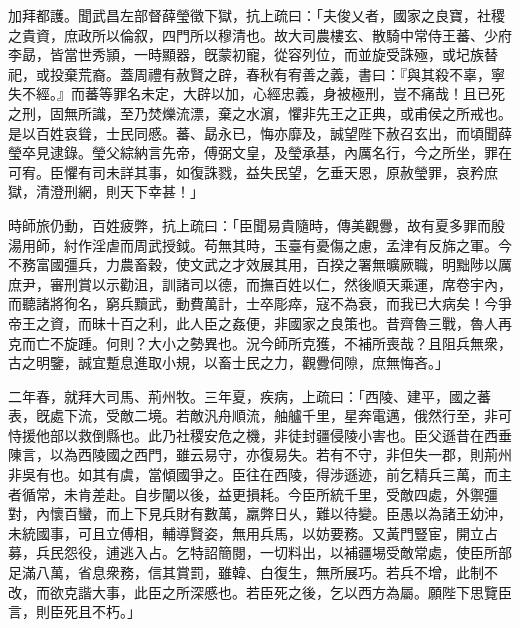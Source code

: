 \begin{pinyinscope}
 
 
 
 加拜都護。聞武昌左部督薛瑩徵下獄，抗上疏曰：「夫俊乂者，國家之良寶，社稷之貴資，庶政所以倫叙，四門所以穆清也。故大司農樓玄、散騎中常侍王蕃、少府李勗，皆當世秀頴，一時顯器，旣蒙初寵，從容列位，而並旋受誅殛，或圮族替祀，或投棄荒裔。蓋周禮有赦賢之辟，春秋有宥善之義，書曰：『與其殺不辜，寧失不經。』而蕃等罪名未定，大辟以加，心經忠義，身被極刑，豈不痛哉！且已死之刑，固無所識，至乃焚爍流漂，棄之水濵，懼非先王之正典，或甫侯之所戒也。是以百姓哀聳，士民同慼。蕃、勗永已，悔亦靡及，誠望陛下赦召玄出，而頃聞薛瑩卒見逮錄。瑩父綜納言先帝，傅弼文皇，及瑩承基，內厲名行，今之所坐，罪在可宥。臣懼有司未詳其事，如復誅戮，益失民望，乞垂天恩，原赦瑩罪，哀矜庶獄，清澄刑網，則天下幸甚！」
 
 
 
 
 時師旅仍動，百姓疲弊，抗上疏曰：「臣聞易貴隨時，傳美觀釁，故有夏多罪而殷湯用師，紂作淫虐而周武授鉞。苟無其時，玉臺有憂傷之慮，孟津有反旆之軍。今不務富國彊兵，力農畜穀，使文武之才效展其用，百揆之署無曠厥職，明黜陟以厲庶尹，審刑賞以示勸沮，訓諸司以德，而撫百姓以仁，然後順天乘運，席卷宇內，而聽諸將徇名，窮兵黷武，動費萬計，士卒彫瘁，寇不為衰，而我已大病矣！今爭帝王之資，而昧十百之利，此人臣之姦便，非國家之良策也。昔齊魯三戰，魯人再克而亡不旋踵。何則？大小之勢異也。況今師所克獲，不補所喪哉？且阻兵無衆，古之明鑒，誠宜蹔息進取小規，以畜士民之力，觀釁伺隙，庶無悔吝。」
 
 
 
 
 二年春，就拜大司馬、荊州牧。三年夏，疾病，上疏曰：「西陵、建平，國之蕃表，旣處下流，受敵二境。若敵汎舟順流，舳艫千里，星奔電邁，俄然行至，非可恃援他部以救倒縣也。此乃社稷安危之機，非徒封疆侵陵小害也。臣父遜昔在西垂陳言，以為西陵國之西門，雖云易守，亦復易失。若有不守，非但失一郡，則荊州非吳有也。如其有虞，當傾國爭之。臣往在西陵，得涉遜迹，前乞精兵三萬，而主者循常，未肯差赴。自步闡以後，益更損耗。今臣所統千里，受敵四處，外禦彊對，內懷百蠻，而上下見兵財有數萬，羸弊日乆，難以待變。臣愚以為諸王幼沖，未統國事，可且立傅相，輔導賢姿，無用兵馬，以妨要務。又黃門豎宦，開立占募，兵民怨役，逋逃入占。乞特詔簡閱，一切料出，以補疆埸受敵常處，使臣所部足滿八萬，省息衆務，信其賞罰，雖韓、白復生，無所展巧。若兵不增，此制不改，而欲克諧大事，此臣之所深慼也。若臣死之後，乞以西方為屬。願陛下思覽臣言，則臣死且不朽。」
 

\end{pinyinscope}
